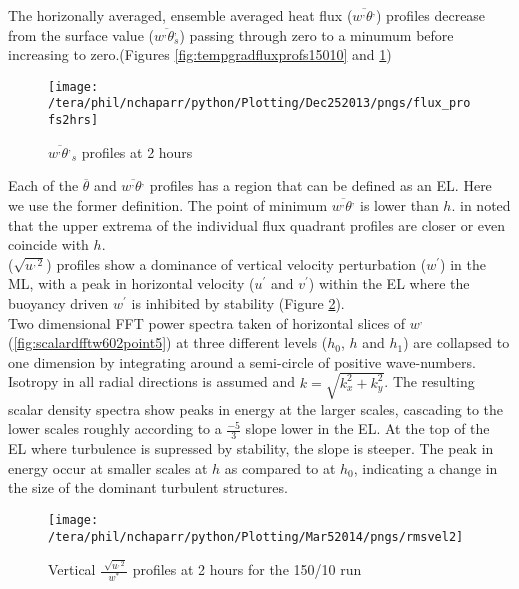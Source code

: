 The horizonally averaged, ensemble averaged heat flux ($\overline{w^{,}\theta^{,}}$) profiles decrease from the surface value
($\overline{w^{,}\theta^{,}_{s}}$) passing through zero to a minumum before increasing to zero.(Figures \ref{fig:tempgradfluxprofs15010} and
 \ref{fig:fluxprofs2hrs})\\

\begin{figure}[htbp]
    \centering
    \texttt{[image: /tera/phil/nchaparr/python/Plotting/Dec252013/pngs/flux\_profs2hrs]}
    \caption{$\overline{w^{,}\theta^{,}}_{s}$ profiles at 2 hours}
    \label{fig:fluxprofs2hrs}   %
\end{figure}

Each of the $\overline{\theta}$ and $\overline{w^{,}\theta^{,}}$ profiles has a region that can be defined as an \acs{EL}.
Here we use the former definition.  The point of minimum $\overline{w^{,}\theta^{,}}$ is lower than $h$.  
\citeauthor{SullMoengStev} in \cite{SullMoengStev} noted that the upper extrema of the individual flux quadrant profiles 
are closer or even coincide with $h$.\\

($\sqrt{u^{,2}}$) profiles show a dominance of vertical velocity perturbation ($w^{'}$) in the \acs{ML}, with a peak in horizontal velocity
($u^{'}$ and $v^{'}$) within the \acs{EL} where the buoyancy driven $w^{'}$ is inhibited by stability (Figure \ref{fig:rmsvel150102hrs}). \\

Two dimensional \acs{FFT} power spectra taken of horizontal slices of $w^{,}$ (\ref{fig:scalardfftw602point5}) at three
different levels ($h_{0}$, $h$ and $h_{1}$) are collapsed to one dimension by integrating around a semi-circle of positive wave-numbers.
Isotropy in all radial directions is assumed and $k = \sqrt{k_{x}^{2} + k_{y}^{2}}$.  The resulting scalar density spectra show peaks in 
energy at the larger scales, cascading to the lower scales roughly according to a $\frac{-5}{3}$ slope lower in the \acs{EL}.  At
the top of the \acs{EL} where turbulence is supressed by stability, the slope is steeper.  The peak in energy occur at smaller scales
at $h$ as compared to at $h_{0}$, indicating a change in the size of the dominant turbulent structures.\\


\begin{figure}[htbp]
    \centering
    \texttt{[image: /tera/phil/nchaparr/python/Plotting/Mar52014/pngs/rmsvel2]}
    \caption{Vertical $\frac{\sqrt[]{u^{,2}}}{w^{*}}$ profiles at 2 hours for the 150/10 run}
    \label{fig:rmsvel150102hrs}   %
\end{figure}

